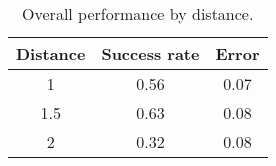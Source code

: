 \begin{table}[H]
\centering
\begin{tabular}{@{} *3c @{}}
\toprule
Distance & Success rate & Error\\
\midrule
 1 		& 0.56 & 0.07\\ 
 1.5  	& 0.63 & 0.08\\
 2 		& 0.32 & 0.08\\
\bottomrule
 \end{tabular}
 \caption{Overall performance by distance.}
\label{table:measurement_by_distance}
\end{table}
